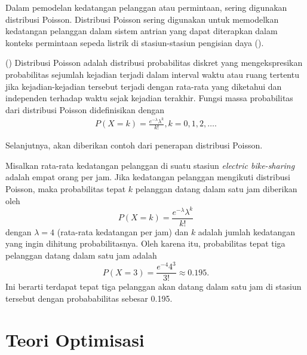 Dalam pemodelan kedatangan pelanggan atau permintaan, sering digunakan distribusi Poisson. Distribusi Poisson sering digunakan untuk memodelkan kedatangan pelanggan dalam sistem antrian yang dapat diterapkan dalam konteks permintaan sepeda listrik di stasiun-stasiun pengisian daya ().

\begin{definisi}()
    Distribusi Poisson adalah distribusi probabilitas diskret yang mengekspresikan probabilitas sejumlah kejadian terjadi dalam interval waktu atau ruang tertentu jika kejadian-kejadian tersebut terjadi dengan rata-rata yang diketahui dan independen terhadap waktu sejak kejadian terakhir. Fungsi massa probabilitas dari distribusi Poisson didefinisikan dengan 
    \begin{align*}
        P(X=k) = \frac{e^{-\lambda}\lambda^k}{k!}, k = 0, 1, 2, \ldots.
    \end{align*}
\end{definisi}

Selanjutnya, akan diberikan contoh dari penerapan distribusi Poisson.

\begin{contoh}
    Misalkan rata-rata kedatangan pelanggan di suatu stasiun \textit{electric bike-sharing} adalah empat orang per jam. Jika kedatangan pelanggan mengikuti distribusi Poisson, maka probabilitas tepat $k$ pelanggan datang dalam satu jam diberikan oleh
    $$P(X = k) = \frac{e^{-\lambda}\lambda^k}{k!}$$
    dengan $\lambda = 4$ (rata-rata kedatangan per jam) dan $k$ adalah jumlah kedatangan yang ingin dihitung probabilitasnya.
    Oleh karena itu, probabilitas tepat tiga pelanggan datang dalam satu jam adalah
    $$P(X = 3) = \frac{e^{-4}4^3}{3!} \approx 0.195.$$
    Ini berarti terdapat tepat tiga pelanggan akan datang dalam satu jam di stasiun tersebut dengan probababilitas sebesar 0.195.
\end{contoh}



\section{Teori Optimisasi}

